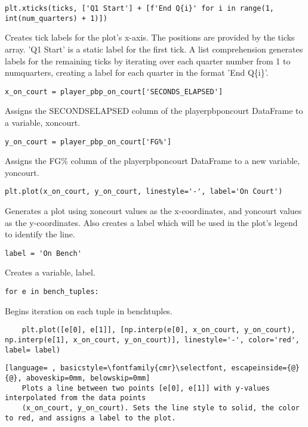 \documentclass{article}
\begin{document}
\begin{lstlisting}
plt.xticks(ticks, ['Q1 Start'] + [f'End Q{i}' for i in range(1, int(num_quarters) + 1)])
\end{lstlisting}
Creates tick labels for the plot's x-axis. The positions are provided by the ticks array. 'Q1 Start' is a static label for the first tick. A list comprehension generates labels for the remaining ticks by iterating over each quarter number from 1 to num\textunderscore quarters, creating a label for each quarter in the format 'End Q\{i\}'.
\begin{lstlisting}
x_on_court = player_pbp_on_court['SECONDS_ELAPSED']
\end{lstlisting}
Assigns the SECONDS\textunderscore ELAPSED column of the player\textunderscore pbp\textunderscore on\textunderscore court DataFrame to a variable, x\textunderscore on\textunderscore court.
\begin{lstlisting}
y_on_court = player_pbp_on_court['FG%']
\end{lstlisting}
Assigns the FG\% column of the player\textunderscore pbp\textunderscore on\textunderscore court DataFrame to a new variable, y\textunderscore on\textunderscore court.
\begin{lstlisting}
plt.plot(x_on_court, y_on_court, linestyle='-', label='On Court')
\end{lstlisting}
Generates a plot using x\textunderscore on\textunderscore court values as the x-coordinates, and y\textunderscore on\textunderscore court values as the y-coordinates. Also creates a label which will be used in the plot's legend to identify the line.
\begin{lstlisting}
label = 'On Bench'
\end{lstlisting}
Creates a variable, label.
\begin{lstlisting}
for e in bench_tuples:
\end{lstlisting}
Begins iteration on each tuple in bench\textunderscore tuples.
\begin{lstlisting}
    plt.plot([e[0], e[1]], [np.interp(e[0], x_on_court, y_on_court), np.interp(e[1], x_on_court, y_on_court)], linestyle='-', color='red', label= label)
\end{lstlisting}
\begin{lstlisting}[language= , basicstyle=\fontfamily{cmr}\selectfont, escapeinside={@}{@}, aboveskip=0mm, belowskip=0mm]
    Plots a line between two points [e[0], e[1]] with y-values interpolated from the data points
    (x_on_court, y_on_court). Sets the line style to solid, the color to red, and assigns a label to the plot.
\end{lstlisting}
\end{document}
